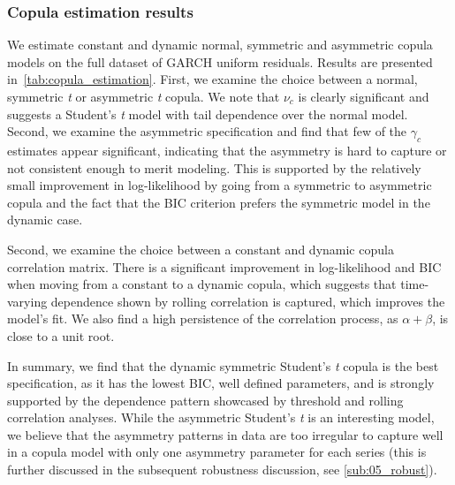 \subsubsection{Copula estimation results}

We estimate constant and dynamic normal, symmetric and asymmetric copula models on the full dataset of GARCH uniform residuals. Results are presented in~\autoref{tab:copula_estimation}. First, we examine the choice between a normal, symmetric \textit{t} or asymmetric \textit{t} copula. We note that $\nu_c$ is clearly significant and suggests a Student's \textit{t} model with tail dependence over the normal model. Second, we examine the asymmetric specification and find that few of the $\gamma_c$ estimates appear significant, indicating that the asymmetry is hard to capture or not consistent enough to merit modeling. This is supported by the relatively small improvement in log-likelihood by going from a symmetric to asymmetric copula and the fact that the BIC criterion prefers the symmetric model in the dynamic case. 

Second, we examine the choice between a constant and dynamic copula correlation matrix. There is a significant improvement in log-likelihood and BIC when moving from a constant to a dynamic copula, which suggests that time-varying dependence shown by rolling correlation is captured, which improves the model's fit. We also find a high persistence of the correlation process, as $\alpha + \beta$, is close to a unit root.

In summary, we find that the dynamic symmetric Student's \textit{t} copula is the best specification, as it has the lowest BIC, well defined parameters, and is strongly supported by the dependence pattern showcased by threshold and rolling correlation analyses. While the asymmetric Student's \textit{t} is an interesting model, we believe that the asymmetry patterns in data are too irregular to capture well in a copula model with only one asymmetry parameter for each series (this is further discussed in the subsequent robustness discussion, see \autoref{sub:05_robust}).
